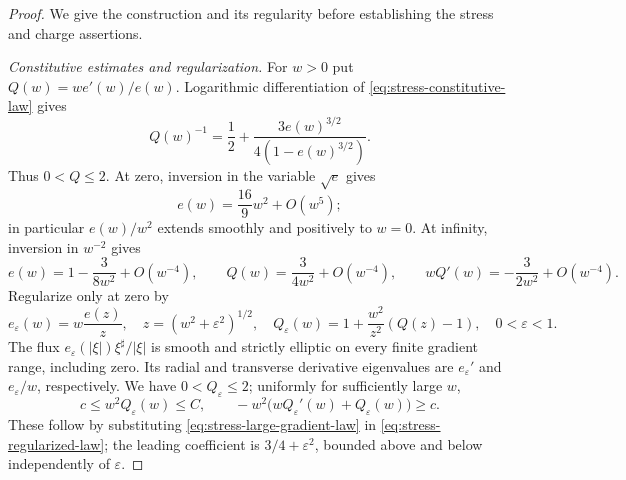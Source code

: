 \begin{proof}
We give the construction and its regularity before establishing the
stress and charge assertions.

\emph{Constitutive estimates and regularization.}
For $w>0$ put $Q(w)=we'(w)/e(w)$.  Logarithmic differentiation of
\eqref{eq:stress-constitutive-law} gives
\begin{equation}
 Q(w)^{-1}=\frac12+\frac{3e(w)^{3/2}}{4(1-e(w)^{3/2})}.
 \label{eq:stress-Q-formula}
\end{equation}
Thus $0<Q\le2$.  At zero, inversion in the variable $\sqrt e$ gives
\[
 e(w)=\frac{16}{9}w^2+O(w^5);
\]
in particular $e(w)/w^2$ extends smoothly and positively to $w=0$.
At infinity, inversion in $w^{-2}$ gives
\begin{equation}
 e(w)=1-\frac{3}{8w^2}+O(w^{-4}),\qquad
 Q(w)=\frac{3}{4w^2}+O(w^{-4}),\qquad
 wQ'(w)=-\frac{3}{2w^2}+O(w^{-4}).
 \label{eq:stress-large-gradient-law}
\end{equation}
Regularize only at zero by
\begin{equation}
 e_\varepsilon(w)=w\frac{e(z)}z,\quad
 z=(w^2+\varepsilon^2)^{1/2},\quad
 Q_\varepsilon(w)=1+\frac{w^2}{z^2}(Q(z)-1),\quad 0<\varepsilon<1.
 \label{eq:stress-regularized-law}
\end{equation}
The flux $e_\varepsilon(|\xi|)\xi^\sharp/|\xi|$ is smooth and strictly
elliptic on every finite gradient range, including zero.  Its radial
and transverse derivative eigenvalues are $e_\varepsilon'$ and
$e_\varepsilon/w$, respectively.  We have $0<Q_\varepsilon\le2$;
uniformly for sufficiently large $w$,
\begin{equation}
 c\le w^2Q_\varepsilon(w)\le C,\qquad
 -w^2\big(wQ_\varepsilon'(w)+Q_\varepsilon(w)\big)\ge c.
 \label{eq:stress-uniform-Q}
\end{equation}
These follow by substituting \eqref{eq:stress-large-gradient-law} in
\eqref{eq:stress-regularized-law}; the leading coefficient is
$3/4+\varepsilon^2$, bounded above and below independently of
$\varepsilon$.


\end{proof}
